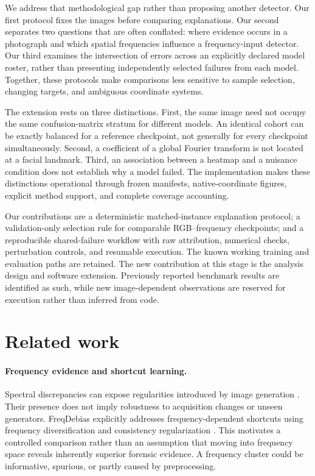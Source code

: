 \documentclass{article}
\begin{document}
We address that methodological gap rather than proposing another detector. Our first protocol fixes the images before comparing explanations. Our second separates two questions that are often conflated: where evidence occurs in a photograph and which spatial frequencies influence a frequency-input detector. Our third examines the intersection of errors across an explicitly declared model roster, rather than presenting independently selected failures from each model. Together, these protocols make comparisons less sensitive to sample selection, changing targets, and ambiguous coordinate systems.

The extension rests on three distinctions. First, the same image need not occupy the same confusion-matrix stratum for different models. An identical cohort can be exactly balanced for a reference checkpoint, not generally for every checkpoint simultaneously. Second, a coefficient of a global Fourier transform is not located at a facial landmark. Third, an association between a heatmap and a nuisance condition does not establish why a model failed. The implementation makes these distinctions operational through frozen manifests, native-coordinate figures, explicit method support, and complete coverage accounting.

Our contributions are a deterministic matched-instance explanation protocol; a validation-only selection rule for comparable RGB--frequency checkpoints; and a reproducible shared-failure workflow with raw attribution, numerical checks, perturbation controls, and resumable execution. The known working training and evaluation paths are retained. The new contribution at this stage is the analysis design and software extension. Previously reported benchmark results are identified as such, while new image-dependent observations are reserved for execution rather than inferred from code.

\section{Related work}
\paragraph{Frequency evidence and shortcut learning.}
Spectral discrepancies can expose regularities introduced by image generation \citep{frank2020}. Their presence does not imply robustness to acquisition changes or unseen generators. FreqDebias explicitly addresses frequency-dependent shortcuts using frequency diversification and consistency regularization \citep{kashiani2025}. This motivates a controlled comparison rather than an assumption that moving into frequency space reveals inherently superior forensic evidence. A frequency cluster could be informative, spurious, or partly caused by preprocessing.
\end{document}

